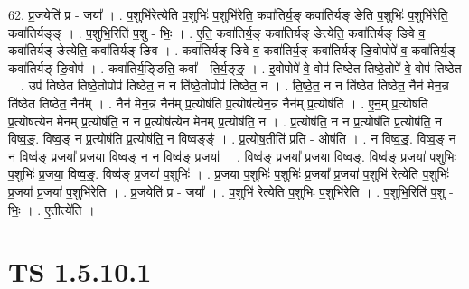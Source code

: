 \documentclass[17pt]{extarticle}
\begin{document}
62. प्र॒जयेति॑ प्र - जया᳚ । . प॒शुभि॑रेत्येति प॒शुभिः॑ प॒शुभि॑रेति॒ कवा॑तिर्य॒ङ् कवा॑तिर्यङ् ङेति प॒शुभिः॑ प॒शुभि॑रेति॒ कवा॑तिर्यङ्ङ् । . प॒शुभि॒रिति॑ प॒शु - भिः॒ । . ए॒ति॒ कवा॑तिर्य॒ङ् कवा॑तिर्यङ् ङेत्येति॒ कवा॑तिर्यङ् ङिवे व॒ कवा॑तिर्यङ् ङेत्येति॒ कवा॑तिर्यङ् ङिव । . कवा॑तिर्यङ् ङिवे व॒ कवा॑तिर्य॒ङ् कवा॑तिर्यङ् ङि॒वोपोपे॑ व॒ कवा॑तिर्य॒ङ् कवा॑तिर्यङ् ङि॒वोप॑ । . कवा॑तिर्य॒ङ्ङिति॒ कवा᳚ - ति॒र्य॒ङ्ङ्॒ । . इ॒वोपोपे॑ वे॒ वोप॑ तिष्ठेत तिष्ठे॒तोपे॑ वे॒ वोप॑ तिष्ठेत । . उप॑ तिष्ठेत तिष्ठे॒तोपोप॑ तिष्ठेत॒ न न ति॑ष्ठे॒तोपोप॑ तिष्ठेत॒ न । . ति॒ष्ठे॒त॒ न न ति॑ष्ठेत तिष्ठेत॒ नैन॑ मेन॒न्न ति॑ष्ठेत तिष्ठेत॒ नैन᳚म् । . नैन॑ मेन॒न्न नैन॑म् प्र॒त्योष॑ति प्र॒त्योष॑त्येन॒न्न नैन॑म् प्र॒त्योष॑ति । . ए॒न॒म् प्र॒त्योष॑ति प्र॒त्योष॑त्येन मेनम् प्र॒त्योष॑ति॒ न न प्र॒त्योष॑त्येन मेनम् प्र॒त्योष॑ति॒ न । . प्र॒त्योष॑ति॒ न न प्र॒त्योष॑ति प्र॒त्योष॑ति॒ न विष्व॒ङ्॒. विष्व॒ङ् न प्र॒त्योष॑ति प्र॒त्योष॑ति॒ न विष्वङ्ङ्॑ । . प्र॒त्योष॒तीति॑ प्रति - ओष॑ति । . न विष्व॒ङ्॒. विष्व॒ङ् न न विष्व॑ङ् प्र॒जया᳚ प्र॒जया॒ विष्व॒ङ् न न विष्व॑ङ् प्र॒जया᳚ । . विष्व॑ङ् प्र॒जया᳚ प्र॒जया॒ विष्व॒ङ्॒. विष्व॑ङ् प्र॒जया॑ प॒शुभिः॑ प॒शुभिः॑ प्र॒जया॒ विष्व॒ङ्॒. विष्व॑ङ् प्र॒जया॑ प॒शुभिः॑ । . प्र॒जया॑ प॒शुभिः॑ प॒शुभिः॑ प्र॒जया᳚ प्र॒जया॑ प॒शुभि॑ रेत्येति प॒शुभिः॑ प्र॒जया᳚ प्र॒जया॑ प॒शुभि॑रेति । . प्र॒जयेति॑ प्र - जया᳚ । . प॒शुभि॑ रेत्येति प॒शुभिः॑ प॒शुभि॑रेति । . प॒शुभि॒रिति॑ प॒शु - भिः॒ । . ए॒तीत्ये॑ति । \newline
\pagebreak
{}
\section*{ TS 1.5.10.1 }
\end{document}
